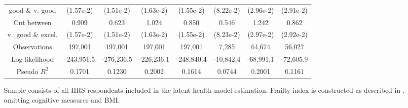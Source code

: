 \begin{table}
\begin{center}
{\begin{tabular}{cccccccc}
good \& v. good                   & (1.57e-2) & (1.51e-2) & (1.63e-2) & (1.55e-2) & (8.22e-2) & (2.96e-2) & (2.91e-2) \\
\rule{0pt}{3ex}Cut between        & 0.909     & 0.623     & 1.024     & 0.850     & 0.546     & 1.242     & 0.862 \\
v.\ good \& excel.                & (1.57e-2) & (1.51e-2) & (1.63e-2) & (1.55e-2) & (8.23e-2) & (2.97e-2) & (2.92e-2) \\
\hline
\rule{0pt}{3ex}Observations       & 197,001 & 197,001 & 197,001 & 197,001 & 7,285 & 64,674 & 56,027 \\
\rule{0pt}{3ex}Log likelihood     & -243,951.5 & -276,236.5 & -226,236.1 & -248,840.4 & -10,842.4 & -68,991.1 & -72,605.9 \\
\rule{0pt}{3ex}Pseudo $R^2$       & 0.1701 & 0.1230 & 0.2002 & 0.1614 & 0.0744 & 0.2001 & 0.1161 \\
\hline \hline
\end{tabular}
} 
\usebox{\TypeProbTableBox}  
\settowidth\TableWidth{\usebox{\TypeProbTableBox}} %
\vspace{0.0cm} \parbox{\TableWidth}{
  \begin{flushleft}
Sample consists of all HRS respondents included in the latent health model estimation. Frailty index is constructed as described in \cite{HosseiniZhao21a}, omitting cognitive measures and BMI.
  \end{flushleft}
}
\end{center}
\end{table}
